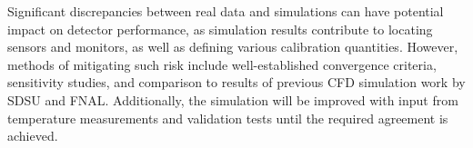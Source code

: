 Significant discrepancies between real data and simulations can have potential impact on detector performance, as simulation results contribute to locating sensors and monitors, as well as defining various calibration quantities. However, methods of mitigating such risk include well-established convergence criteria, sensitivity studies, and comparison to results of previous CFD simulation work by SDSU and FNAL. Additionally, the simulation will be improved with input from temperature measurements and validation tests until the required agreement is achieved.


  
